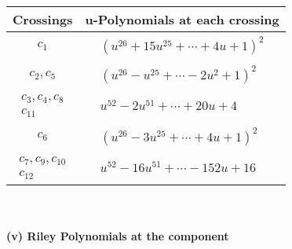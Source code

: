 \documentclass[1p]{elsarticle_modified}
\theoremstyle{definition}
\begin{document}
\begin{tabular}{m{50pt}|m{274pt}}
Crossings & \hspace{64pt}u-Polynomials at each crossing \\
\hline $$\begin{aligned}c_{1}\end{aligned}$$&$\begin{aligned}
&(u^{26}+15 u^{25}+\cdots+4 u+1)^{2}
\end{aligned}$\\
\hline $$\begin{aligned}c_{2},c_{5}\end{aligned}$$&$\begin{aligned}
&(u^{26}- u^{25}+\cdots-2 u^2+1)^{2}
\end{aligned}$\\
\hline $$\begin{aligned}c_{3},c_{4},c_{8}\\c_{11}\end{aligned}$$&$\begin{aligned}
&u^{52}-2 u^{51}+\cdots+20 u+4
\end{aligned}$\\
\hline $$\begin{aligned}c_{6}\end{aligned}$$&$\begin{aligned}
&(u^{26}-3 u^{25}+\cdots+4 u+1)^{2}
\end{aligned}$\\
\hline $$\begin{aligned}c_{7},c_{9},c_{10}\\c_{12}\end{aligned}$$&$\begin{aligned}
&u^{52}-16 u^{51}+\cdots-152 u+16
\end{aligned}$\\
\hline
\end{tabular}\\~\\
\newpage\renewcommand{\arraystretch}{1}
\flushleft \textbf{(v) Riley Polynomials at the component}\newline \\
\end{document}
